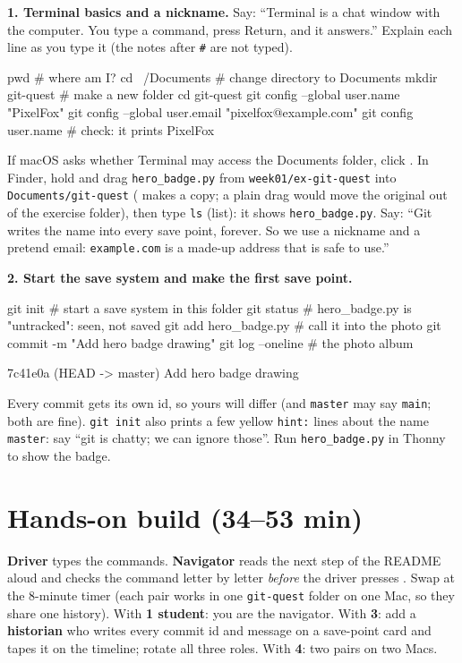 \begin{workedexample}
\textbf{1. Terminal basics and a nickname.} Say: \enquote{Terminal is a chat window with the computer. You type a command, press Return, and it answers.} Explain each line as you type it (the notes after \texttt{\#} are not typed).
\begin{shellcode}
pwd                # where am I?
cd ~/Documents     # change directory to Documents
mkdir git-quest    # make a new folder
cd git-quest
git config --global user.name "PixelFox"
git config --global user.email "pixelfox@example.com"
git config user.name     # check: it prints PixelFox
\end{shellcode}
If macOS asks whether Terminal may access the Documents folder, click . In Finder, hold  and drag \texttt{hero\_badge.py} from \texttt{week01/ex-git-quest} into \texttt{Documents/git-quest} ( makes a copy; a plain drag would move the original out of the exercise folder), then type \texttt{ls} (list): it shows \texttt{hero\_badge.py}. Say: \enquote{Git writes the name into every save point, forever. So we use a nickname and a pretend email: \texttt{example.com} is a made-up address that is safe to use.}

\textbf{2. Start the save system and make the first save point.}
\begin{shellcode}
git init                 # start a save system in this folder
git status               # hero_badge.py is "untracked": seen, not saved
git add hero_badge.py    # call it into the photo
git commit -m "Add hero badge drawing"
git log --oneline        # the photo album
\end{shellcode}
\begin{outputcode}
7c41e0a (HEAD -> master) Add hero badge drawing
\end{outputcode}
Every commit gets its own id, so yours will differ (and \texttt{master} may say \texttt{main}; both are fine). \texttt{git init} also prints a few yellow \texttt{hint:} lines about the name \texttt{master}: say \enquote{git is chatty; we can ignore those}. Run \texttt{hero\_badge.py} in Thonny to show the badge.
\end{workedexample}

\section{Hands-on build (34--53 min)}
\begin{pairroles}
\textbf{Driver} types the commands. \textbf{Navigator} reads the next step of the README aloud and checks the command letter by letter \emph{before} the driver presses . Swap at the 8-minute timer (each pair works in one \texttt{git-quest} folder on one Mac, so they share one history).
With \textbf{1 student}: you are the navigator. With \textbf{3}: add a \textbf{historian} who writes every commit id and message on a save-point card and tapes it on the timeline; rotate all three roles. With \textbf{4}: two pairs on two Macs.
\end{pairroles}

